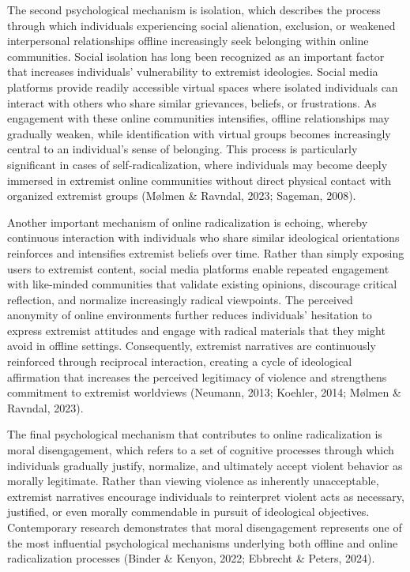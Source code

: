\documentclass[10pt]{NSP1}
\begin{document}
The second psychological mechanism is isolation, which describes the process through which individuals experiencing social alienation, exclusion, or weakened interpersonal relationships offline increasingly seek belonging within online communities. Social isolation has long been recognized as an important factor that increases individuals' vulnerability to extremist ideologies. Social media platforms provide readily accessible virtual spaces where isolated individuals can interact with others who share similar grievances, beliefs, or frustrations. As engagement with these online communities intensifies, offline relationships may gradually weaken, while identification with virtual groups becomes increasingly central to an individual's sense of belonging. This process is particularly significant in cases of self-radicalization, where individuals may become deeply immersed in extremist online communities without direct physical contact with organized extremist groups (Mølmen \& Ravndal, 2023; Sageman, 2008).

\par\medskip{}\smallskip

Another important mechanism of online radicalization is echoing, whereby continuous interaction with individuals who share similar ideological orientations reinforces and intensifies extremist beliefs over time. Rather than simply exposing users to extremist content, social media platforms enable repeated engagement with like-minded communities that validate existing opinions, discourage critical reflection, and normalize increasingly radical viewpoints. The perceived anonymity of online environments further reduces individuals' hesitation to express extremist attitudes and engage with radical materials that they might avoid in offline settings. Consequently, extremist narratives are continuously reinforced through reciprocal interaction, creating a cycle of ideological affirmation that increases the perceived legitimacy of violence and strengthens commitment to extremist worldviews (Neumann, 2013; Koehler, 2014; Mølmen \& Ravndal, 2023).

\par\medskip{}\smallskip

The final psychological mechanism that contributes to online radicalization is moral disengagement, which refers to a set of cognitive processes through which individuals gradually justify, normalize, and ultimately accept violent behavior as morally legitimate. Rather than viewing violence as inherently unacceptable, extremist narratives encourage individuals to reinterpret violent acts as necessary, justified, or even morally commendable in pursuit of ideological objectives. Contemporary research demonstrates that moral disengagement represents one of the most influential psychological mechanisms underlying both offline and online radicalization processes (Binder \& Kenyon, 2022; Ebbrecht \& Peters, 2024).
\end{document}
